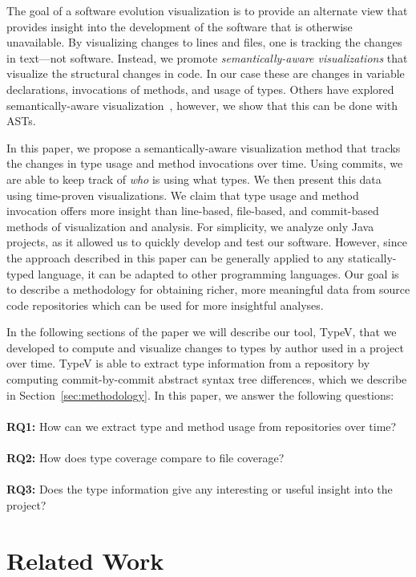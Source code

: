 The goal of a software evolution visualization is to provide an alternate view that provides insight into the development of the software that is otherwise unavailable. By visualizing changes to lines and files, one is tracking the changes in text---not software. Instead, we promote \emph{semantically-aware visualizations} that visualize the structural changes in code. In our case these are changes in variable declarations, invocations of methods, and usage of types. Others have explored semantically-aware visualization~\cite{sourcevis,6980224,Kim:2009:DRS:1555001.1555046,7332410}, however, we show that this can be done with ASTs.

In this paper, we propose a semantically-aware visualization method that tracks the changes in type usage and method invocations over time. Using commits, we are able to keep track of \emph{who} is using what types. We then present this data using time-proven visualizations. We claim that type usage and method invocation offers more insight than line-based, file-based, and commit-based methods of visualization and analysis. For simplicity, we analyze only Java projects, as it allowed us to quickly develop and test our software. However, since the approach described in this paper can be generally applied to any statically-typed language, it can be adapted to other programming languages. Our goal is to describe a methodology for obtaining richer, more meaningful data from source code repositories which can be used for more insightful analyses.

In the following sections of the paper we will describe our tool, TypeV, that we developed to compute and visualize changes to types by author used in a project over time. TypeV is able to extract type information from a repository by computing commit-by-commit abstract syntax tree differences, which we describe in Section~\ref{sec:methodology}. In this paper, we answer the following questions: \\ \\
\textbf{RQ1:} How can we extract type and method usage from repositories over time? \\ \\
\textbf{RQ2:} How does type coverage compare to file coverage?
\\ \\
\textbf{RQ3:} Does the type information give any interesting or useful insight into the project?

\section{Related Work}

